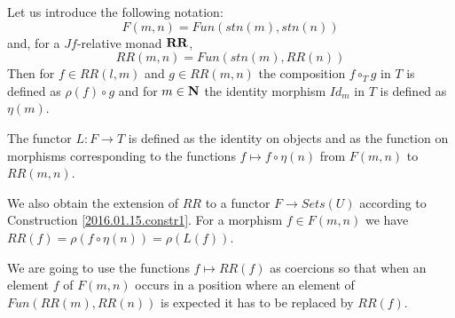 \documentclass[11pt]{article}
\newcommand{\sr}{\rightarrow}
\newcommand{\nn}{{\bf N\rm}}
\newcommand{\nat}{\nn}
\newcommand{\mbind}{\rho}
\newcommand{\hc}{\circ_{T}}
\newcommand{\RR}{{\bf RR}}
\begin{document}
Let us introduce the following notation:
%
$$F(m,n)=Fun(stn(m),stn(n))$$
%
and, for a $Jf$-relative monad $\RR$,
%
$$RR(m,n)=Fun(stn(m),RR(n))$$
%
Then for $f\in RR(l,m)$ and $g\in RR(m,n)$ the composition $f\hc g$ in $T$ is defined as $\mbind(f)\circ g$ and for $m\in\nat$ the identity morphism $Id_m$ in $T$ is defined as $\eta(m)$. 

The functor $L:F\sr T$ is defined as the identity on objects and as the function on morphisms corresponding to the functions $f\mapsto f\circ \eta(n)$ from $F(m,n)$ to $RR(m,n)$. 

We also obtain the extension of $RR$ to a functor $F\sr Sets(U)$ according to Construction \ref{2016.01.15.constr1}. For a morphism $f\in F(m,n)$ we have $RR(f)=\mbind(f\circ \eta(n))=\mbind(L(f))$. 

We are going to use the functions $f\mapsto RR(f)$ as coercions so that when an element $f$ of $F(m,n)$ occurs in a position where an element of $Fun(RR(m),RR(n))$ is expected it has to be replaced by $RR(f)$. 
\end{document}
